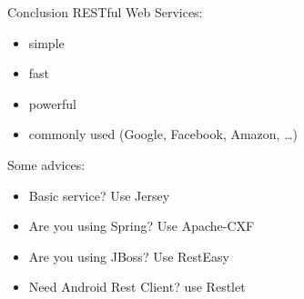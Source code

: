 \begin{frame}{Conclusion}
	RESTful Web Services: 
	\begin{itemize}
	  \item simple
	  \item fast
	  \item powerful
	  \item commonly used (Google, Facebook, Amazon, \ldots)
	\end{itemize} 

	\vspace{0.5cm}

	Some advices: 
	\begin{itemize}
		\item Basic service? Use Jersey
		\item Are you using Spring? Use Apache-CXF
		\item Are you using JBoss? Use RestEasy
		\item Need Android Rest Client? use Restlet	
	\end{itemize}
\end{frame}

 